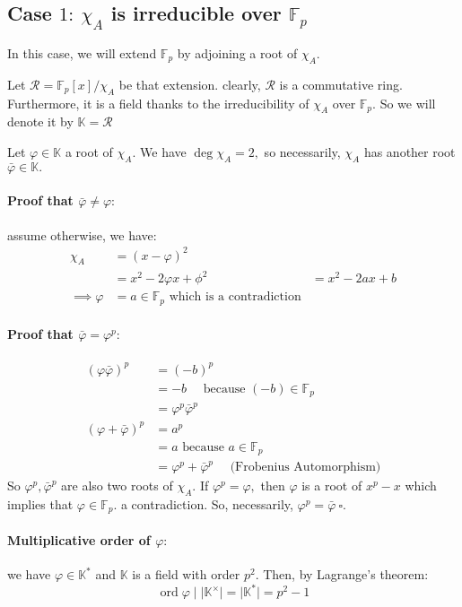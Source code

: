 \documentclass[]{article}
\DeclareMathOperator{\ord}{ord}
\begin{document}
\subsection{Case $1: \ \chi_A$ is irreducible over $\mathbb{F}_p$}
In this case, we will extend $\mathbb{F}_p$ by adjoining a root of $\chi_A.$

Let $\mathcal{R}=\mathbb{F}_p[x]/\chi_A$ be that extension. clearly, $\mathcal{R}$ is a commutative ring. Furthermore, it is a field thanks to the irreducibility of $\chi_A$ over $\mathbb{F}_p.$ So we will denote it by $\mathbb{K}=\mathcal{R}$

Let $\varphi \in\mathbb{K}$ a root of $\chi_A.$ We have $\deg \chi_A = 2,$ so necessarily, $\chi_A$ has another root $\bar\varphi \in\mathbb{K}.$
\paragraph{Proof that $\bar\varphi \neq \varphi:$} assume otherwise, we have:
\begin{align*}
	\chi_A&=(x-\varphi)^2\\
	&=x^2-2\varphi x  + \phi ^2
	&= x^2 -2ax+b\\
\implies \varphi &= a \in\mathbb{F}_p \text{ which is a contradiction}
\end{align*}
\paragraph{Proof that $\bar\varphi = \varphi ^p:$}
\begin{align*}
	(\varphi\bar\varphi)^p&=(-b)^p\\
	&=-b \quad\text{ because } (-b)\in\mathbb{F}_p \\
	&=\varphi^p\bar\varphi^p\\
	(\varphi+\bar\varphi)^p&=a^p\\
	&=a \text{ because } a\in\mathbb{F}_p \\
	&=\varphi^p+\bar\varphi^p\quad \text{ (Frobenius Automorphism)}
\end{align*}
So $\varphi^p,\bar\varphi^p$ are also two roots of $\chi_A.$ If $\varphi^p=\varphi,$ then $\varphi$ is a root of $x^p-x$ which implies that $\varphi\in\mathbb{F}_p.$ a contradiction.
\newline
So, necessarily, $\varphi^p=\bar\varphi \ \square .$
\paragraph{Multiplicative order of $\varphi:$} we have $\varphi \in\mathbb{K}^*$ and $\mathbb{K}$ is a field with order $p^2.$ Then, by Lagrange's theorem:
$$
	\ord \varphi \mid \lvert  \mathbb{K}^{\times}\rvert =\lvert  \mathbb{K}^{*}\rvert= p^2-1
$$ 
\end{document}
